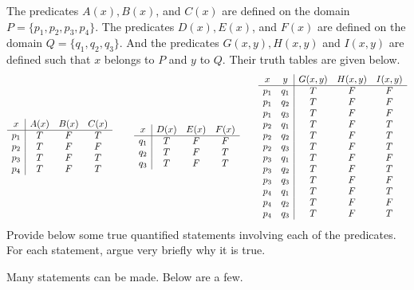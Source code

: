 \documentclass[addpoints]{exam}
\theoremstyle{definition}
\theoremstyle{claim}
\begin{document}
\begin{questions}
  \question [10] The predicates $A(x), B(x)$, and $C(x)$ are defined on the domain $P=\{p_1,p_2,p_3,p_4\}$. The predicates $D(x), E(x)$, and $F(x)$ are defined on the domain $Q=\{q_1,q_2,q_3\}$. And the predicates $G(x,y), H(x,y)$ and  $I(x,y)$ are defined such that $x$ belongs to $P$ and $y$ to $Q$. Their truth tables are given below.
  \[
    \begin{array}{{c|ccc}}
      x & A(x) & B(x) & C(x) \\
      \hline
      p_1 & T & F & T \\
      p_2 & T & F & F \\
      p_3 & T & F & T \\
      p_4 & T & F & T \\
    \end{array}\
    \qquad
    \begin{array}{{c|ccc}}
      x & D(x) & E(x) & F(x) \\
      \hline
      q_1 & T & F & F \\
      q_2 & T & F & T \\
      q_3 & T & F & T \\
    \end{array}
    \qquad
    \begin{array}{{cc|ccc}}
      x & y & G(x,y) & H(x,y) & I(x,y)\\
      \hline
      p_1 & q_1 & T & F & F \\
      p_1 & q_2 & T & F & F \\
      p_1 & q_3 & T & F & F \\
      p_2 & q_1 & T & F & T \\
      p_2 & q_2 & T & F & T \\
      p_2 & q_3 & T & F & T \\
      p_3 & q_1 & T & F & F \\
      p_3 & q_2 & T & F & T \\
      p_3 & q_3 & T & F & F \\
      p_4 & q_1 & T & F & T \\
      p_4 & q_2 & T & F & F \\
      p_4 & q_3 & T & F & T \\
    \end{array}
  \]  
  Provide below some true quantified statements involving each of the predicates. For each statement, argue very briefly why it is true.
  
  \begin{solution}
    Many statements can be made. Below are a few.
    

\end{solution}
\end{questions}
\end{document}
